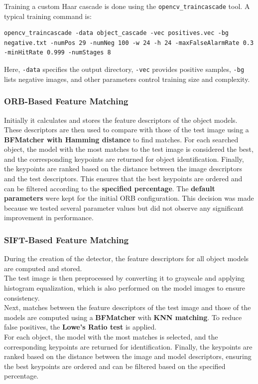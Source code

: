\documentclass[10.5pt,a4paper]{article}
\begin{document}
    Training a custom Haar cascade is done using the \texttt{opencv\_traincascade} tool. A typical training command is:

    \begin{lstlisting}[]
opencv_traincascade -data object_cascade -vec positives.vec -bg negative.txt -numPos 29 -numNeg 100 -w 24 -h 24 -maxFalseAlarmRate 0.3 -minHitRate 0.999 -numStages 8
    \end{lstlisting}

    Here, \texttt{-data} specifies the output directory, \texttt{-vec} provides positive samples, \texttt{-bg} lists negative images, and other parameters control training size and complexity.

\subsubsection*{ORB-Based Feature Matching}
    Initially it calculates and stores the feature descriptors of the object models. These descriptors are then used to compare with those of the test image using a \textbf{BFMatcher with Hamming distance} to find matches. For each searched object, the model with the most matches to the test image is considered the best, and the corresponding keypoints are returned for object identification. Finally, the keypoints are ranked based on the distance between the image descriptors and the test descriptors. This ensures that the best keypoints are ordered and can be filtered according to the \textbf{specified percentage}. The \textbf{default parameters} were kept for the initial ORB configuration. This decision was made because we tested several parameter values but did not observe any significant improvement in performance.

\subsubsection*{SIFT-Based Feature Matching}
    During the creation of the detector, the feature descriptors for all object models are computed and stored.\\
    The test image is then preprocessed by converting it to grayscale and applying histogram equalization, which is also performed on the model images to ensure consistency.\\
    Next, matches between the feature descriptors of the test image and those of the models are computed using a \textbf{BFMatcher} with \textbf{KNN matching}. To reduce false positives, the \textbf{Lowe’s Ratio test} is applied.\\
    For each object, the model with the most matches is selected, and the corresponding keypoints are returned for identification. Finally, the keypoints are ranked based on the distance between the image and model descriptors, ensuring the best keypoints are ordered and can be filtered based on the specified percentage.
\end{document}

